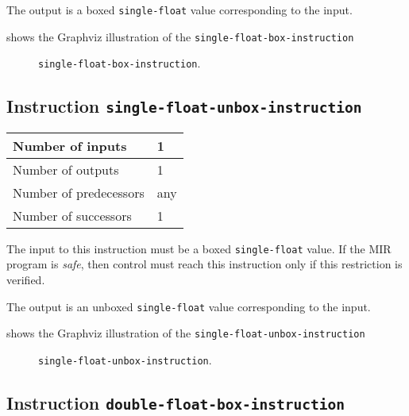 The output is a boxed \texttt{single-float} value corresponding to the
input.

 shows the Graphviz illustration of the
\texttt{single-float-box-instruction}

\begin{figure}
\begin{center}
\end{center}
\caption{\label{fig-single-float-box-instruction}
\texttt{single-float-box-instruction}.}
\end{figure}

\subsection{Instruction \texttt{single-float-unbox-instruction}}
\label{mir-instruction-single-float-unbox}

\begin{tabular}{|l|l|}
\hline
Number of inputs & 1\\
\hline
Number of outputs & 1\\
\hline
Number of predecessors & any\\
\hline
Number of successors & 1\\
\hline
\end{tabular}

The input to this instruction must be a boxed \texttt{single-float}
value.  If the MIR program is \emph{safe}, then control must reach
this instruction only if this restriction is verified.

The output is an unboxed \texttt{single-float} value corresponding to
the input.

 shows the Graphviz illustration of the
\texttt{single-float-unbox-instruction}

\begin{figure}
\begin{center}
\end{center}
\caption{\label{fig-single-float-unbox-instruction}
\texttt{single-float-unbox-instruction}.}
\end{figure}

\subsection{Instruction \texttt{double-float-box-instruction}}
\label{mir-instruction-double-float-box}

